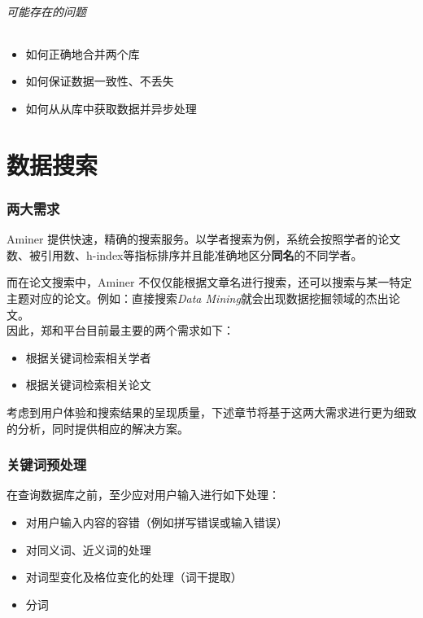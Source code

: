 \documentclass[UTF8]{ctexrep}
\begin{document}
\paragraph{可能存在的问题}

\begin{itemize}
    \item 如何正确地合并两个库
    \item 如何保证数据一致性、不丢失
    \item 如何从从库中获取数据并异步处理
\end{itemize}


\part{数据搜索}

\section{两大需求}

Aminer 提供快速，精确的搜索服务。以学者搜索为例，系统会按照学者的论文数、被引用数、h-index等指标排序并且能准确地区分\textbf{同名}的不同学者。

而在论文搜索中，Aminer 不仅仅能根据文章名进行搜索，还可以搜索与某一特定主题对应的论文。例如：直接搜索\textit{Data Mining}就会出现数据挖掘领域的杰出论文。\\

因此，郑和平台目前最主要的两个需求如下：

\begin{itemize}
    \item 根据关键词检索相关学者
    \item 根据关键词检索相关论文
\end{itemize}

考虑到用户体验和搜索结果的呈现质量，下述章节将基于这两大需求进行更为细致的分析，同时提供相应的解决方案。

\section{关键词预处理}

在查询数据库之前，至少应对用户输入进行如下处理：

\begin{itemize}
    \item 对用户输入内容的容错（例如拼写错误或输入错误）
    \item 对同义词、近义词的处理
    \item 对词型变化及格位变化的处理（词干提取）
    \item 分词
\end{itemize}
\end{document}
